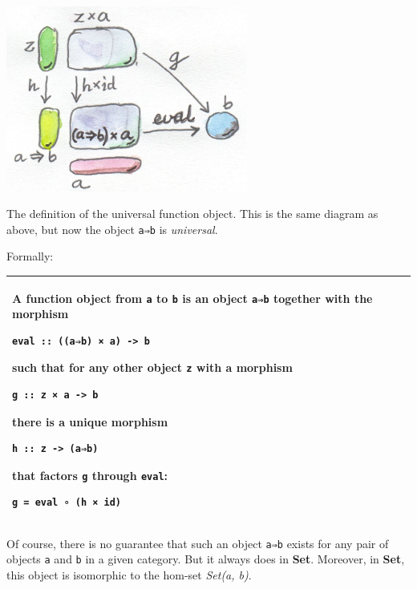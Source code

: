 \hypertarget{attachment_4246}{}
\includegraphics[width=3.12500in]{images/universalfunctionobject.jpg}

The definition of the universal function object. This is the same
diagram as above, but now the object \texttt{a⇒b} is \emph{universal}.

Formally:

\begin{longtable}[]{@{}l@{}}
\toprule
\begin{minipage}[t]{0.97\columnwidth}\raggedright\strut
A \textbf{function object} from \texttt{a} to \texttt{b} is an object
\texttt{a⇒b} together with the morphism

\begin{verbatim}
eval :: ((a⇒b) × a) -> b
\end{verbatim}

such that for any other object \texttt{z} with a morphism

\begin{verbatim}
g :: z × a -> b
\end{verbatim}

there is a unique morphism

\begin{verbatim}
h :: z -> (a⇒b)
\end{verbatim}

that factors \texttt{g} through \texttt{eval}:

\begin{verbatim}
g = eval ∘ (h × id)
\end{verbatim}
\strut
\end{minipage}\tabularnewline
\bottomrule
\end{longtable}

Of course, there is no guarantee that such an object \texttt{a⇒b} exists
for any pair of objects \texttt{a} and \texttt{b} in a given category.
But it always does in \textbf{Set}. Moreover, in \textbf{Set}, this
object is isomorphic to the hom-set \emph{Set(a, b)}.


